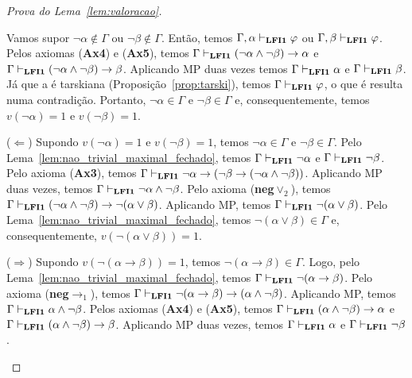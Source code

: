 \begin{proof}[Prova do Lema~\ref{lem:valoracao}]
\begin{provaporcasos}
\begin{adjustwidth}{1cm}{}
                            \noindent Vamos supor $\neg \alpha \not \in \Gamma$ ou $\neg \beta \not \in \Gamma$. Então, temos $\Gamma, \alpha \vdash_{{\normalfont\textbf{LFI1}}{}} \varphi$ ou $\Gamma, \beta \vdash_{{\normalfont\textbf{LFI1}}{}} \varphi$. Pelos axiomas (\textbf{Ax4}) e (\textbf{Ax5}), temos $\Gamma \vdash_{{\normalfont\textbf{LFI1}}{}} (\neg \alpha \land \neg \beta) \to \alpha$ e $\Gamma \vdash_{{\normalfont\textbf{LFI1}}{}} (\neg \alpha \land \neg \beta) \to \beta$. Aplicando MP duas vezes temos $\Gamma \vdash_{{\normalfont\textbf{LFI1}}{}} \alpha$ e $\Gamma \vdash_{{\normalfont\textbf{LFI1}}{}} \beta$. Já que a \lfium{} é tarskiana (Proposição~\ref{prop:tarski}), temos $\Gamma \vdash_{{\normalfont\textbf{LFI1}}{}} \varphi$, o que é resulta numa contradição. Portanto, $\neg \alpha \in \Gamma$ e $\neg \beta \in \Gamma$ e, consequentemente, temos $v(\neg \alpha) = 1$ e $v(\neg \beta) = 1$. 
                            
                            \noindent ($\Longleftarrow$) Supondo $v(\neg \alpha) = 1$ e $v(\neg \beta) = 1$, temos $\neg \alpha \in \Gamma$ e $\neg \beta \in \Gamma$. Pelo Lema~\ref{lem:nao_trivial_maximal_fechado}, temos $\Gamma \vdash_{{\normalfont\textbf{LFI1}}{}} \neg \alpha$ e $\Gamma \vdash_{{\normalfont\textbf{LFI1}}{}} \neg \beta$. Pelo axioma (\textbf{Ax3}), temos $\Gamma \vdash_{{\normalfont\textbf{LFI1}}{}} \neg \alpha \to (\neg \beta \to (\neg \alpha \land \neg \beta))$. Aplicando MP duas vezes, temos $\Gamma \vdash_{{\normalfont\textbf{LFI1}}{}} \neg \alpha \land \neg \beta$. Pelo axioma (\textbf{neg}$\lor_2$), temos $\Gamma \vdash_{{\normalfont\textbf{LFI1}}{}} (\neg \alpha \land \neg \beta) \to \neg (\alpha \lor \beta)$. Aplicando MP, temos $\Gamma \vdash_{{\normalfont\textbf{LFI1}}{}} \neg (\alpha \lor \beta)$. Pelo Lema~\ref{lem:nao_trivial_maximal_fechado}, temos $\neg (\alpha \lor \beta) \in \Gamma$ e, consequentemente, $v(\neg (\alpha \lor \beta)) = 1$.

                        \end{adjustwidth}


                        \begin{adjustwidth}{1cm}{}
                            
                            \noindent ($\Longrightarrow$) Supondo $v(\neg (\alpha \to \beta)) = 1$, temos $\neg (\alpha \to \beta) \in \Gamma$. Logo, pelo Lema~\ref{lem:nao_trivial_maximal_fechado}, temos $\Gamma \vdash_{{\normalfont\textbf{LFI1}}{}} \neg (\alpha \to \beta)$. Pelo axioma (\textbf{neg}$\to_1$), temos $\Gamma \vdash_{{\normalfont\textbf{LFI1}}{}} \neg (\alpha \to \beta) \to (\alpha \land \neg \beta)$. Aplicando MP, temos $\Gamma \vdash_{{\normalfont\textbf{LFI1}}{}} \alpha \land \neg \beta$. Pelos axiomas (\textbf{Ax4}) e (\textbf{Ax5}), temos $\Gamma \vdash_{{\normalfont\textbf{LFI1}}{}} (\alpha \land \neg \beta) \to \alpha$ e $\Gamma \vdash_{{\normalfont\textbf{LFI1}}{}} (\alpha \land \neg \beta) \to \beta$. Aplicando MP duas vezes, temos $\Gamma \vdash_{{\normalfont\textbf{LFI1}}{}} \alpha$ e $\Gamma \vdash_{{\normalfont\textbf{LFI1}}{}} \neg \beta$.


\end{adjustwidth}
\end{provaporcasos}
\end{proof}
